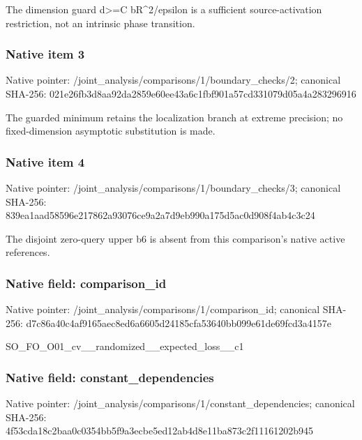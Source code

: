 \documentclass[10pt,a4paper]{article}
\begin{document}
\begingroup\raggedright\sloppy The dimension guard d>=\allowbreak{}C bR\textasciicircum{}2/\allowbreak{}epsilon is a sufficient source-activation restriction,\allowbreak{} not an intrinsic phase transition.\par\endgroup

\subsubsection{Native item 3}
Native pointer: /joint\_\allowbreak{}analysis/comparisons/1/boundary\_\allowbreak{}checks/2; canonical SHA-256: 021e26fb3d8aa92da2859e60ee43a6c1fbf901a57cd331079d05a4a283296916

\begingroup\raggedright\sloppy The guarded minimum retains the localization branch at extreme precision;\allowbreak{} no fixed-dimension asymptotic substitution is made.\par\endgroup

\subsubsection{Native item 4}
Native pointer: /joint\_\allowbreak{}analysis/comparisons/1/boundary\_\allowbreak{}checks/3; canonical SHA-256: 839ea1aad58596e217862a93076ce9a2a7d9eb990a175d5ac0d908f4ab4c3c24

\begingroup\raggedright\sloppy The disjoint zero-query upper b6 is absent from this comparison's native active references.\par\endgroup

\subsubsection{Native field: comparison\_\allowbreak{}id}
Native pointer: /joint\_\allowbreak{}analysis/comparisons/1/comparison\_\allowbreak{}id; canonical SHA-256: d7c86a40c4af9165aec8ed6a6605d24185cfa53640bb099e61de69fcd3a4157e

\begingroup\raggedright\sloppy SO\_\allowbreak{}FO\_\allowbreak{}O01\_\allowbreak{}cv\_\allowbreak{}\_\allowbreak{}randomized\_\allowbreak{}\_\allowbreak{}expected\_\allowbreak{}loss\_\allowbreak{}\_\allowbreak{}c1\par\endgroup

\subsubsection{Native field: constant\_\allowbreak{}dependencies}
Native pointer: /joint\_\allowbreak{}analysis/comparisons/1/constant\_\allowbreak{}dependencies; canonical SHA-256: 4f53cda18c2baa0c0354bb5f9a3ecbe5ed12ab4d8e11ba873c2f11161202b945
\end{document}
